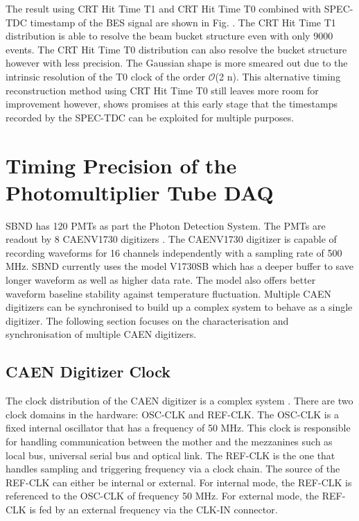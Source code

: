 The result using CRT Hit Time T1 and CRT Hit Time T0 combined with SPEC-TDC timestamp of the BES signal are shown in Fig. {}.
The CRT Hit Time T1 distribution is able to resolve the beam bucket structure even with only 9000 events.
The CRT Hit Time T0 distribution can also resolve the bucket structure however with less precision. 
The Gaussian shape is more smeared out due to the intrinsic resolution of the T0 clock of the order $\mathcal{O}$(2 n).
This alternative timing reconstruction method using CRT Hit Time T0 still leaves more room for improvement however, shows promises at this early stage that the timestamps recorded by the SPEC-TDC can be exploited for multiple purposes.

\section{Timing Precision of the Photomultiplier Tube DAQ}
\label{section5.4}

SBND has 120 PMTs as part the Photon Detection System. 
The PMTs are readout by 8 CAENV1730 digitizers \cite{}.
The CAENV1730 digitizer is capable of recording waveforms for 16 channels independently with a sampling rate of 500 MHz.
SBND currently uses the model V1730SB which has a deeper buffer to save longer waveform as well as higher data rate.
The model also offers better waveform baseline stability against temperature fluctuation.
Multiple CAEN digitizers can be synchronised to build up a complex system to behave as a single digitizer.
The following section focuses on the characterisation and synchronisation of multiple CAEN digitizers.

\subsection{CAEN Digitizer Clock}

The clock distribution of the CAEN digitizer is a complex system \cite{}.
There are two clock domains in the hardware: OSC-CLK and REF-CLK.
The OSC-CLK is a fixed internal oscillator that has a frequency of 50 MHz. 
This clock is responsible for handling communication between the mother and the mezzanines such as local bus, universal serial bus and optical link.
The REF-CLK is the one that handles sampling and triggering frequency via a clock chain.
The source of the REF-CLK can either be internal or external.
For internal mode, the REF-CLK is referenced to the OSC-CLK of frequency 50 MHz.
For external mode, the REF-CLK is fed by an external frequency via the CLK-IN connector. 

